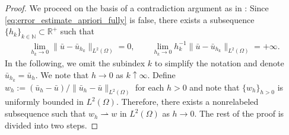 \documentclass[final]{siamart0216}
\begin{document}
\begin{proof}
We proceed on the basis of a contradiction argument as in \cite[Section 7]{MR2272157}: Since \eqref{eq:error_estimate_apriori_fully} is false, there exists a subsequence $\{h_k\}_{k\in\mathbb{N}}\subset \mathbb{R}^{+}$ such that
\begin{align}\label{eq:auxuliary_error_estimate_fd}
\lim_{h_{k} \rightarrow 0} \|\bar{u}-\bar{u}_{h_k}\|_{L^2(\Omega)} = 0,
\qquad \lim_{h_{k} \rightarrow 0} h_k^{-1} \|\bar{u}-\bar{u}_{h_k}\|_{L^2(\Omega)}=+\infty.
\end{align}
In the following, we omit the subindex $k$ to simplify the notation and denote $\bar{u}_{h_k}=\bar{u}_{h}$. We note that $h \rightarrow 0$ as $k \uparrow \infty$. Define $w_h:=(\bar{u}_h-\bar{u})/\|\bar{u}_h-\bar{u}\|_{L^2(\Omega)}$ for each $h>0$ and note that $\{ w_h \}_{h>0}$ is uniformly bounded in $L^2(\Omega)$. Therefore, there exists a nonrelabeled subsequence such that $w_h \rightharpoonup w$ in $L^2(\Omega)$ as $h\rightarrow 0$. The rest of the proof is divided into two steps.


\end{proof}
\end{document}
